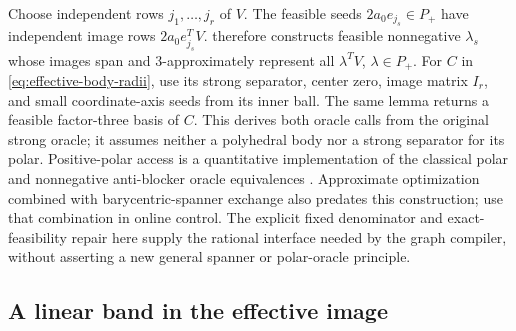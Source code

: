 Choose independent rows $j_1,\ldots,j_r$ of $V$.
The feasible seeds $2a_0e_{j_s}\in P_+$ have independent image rows
$2a_0e_{j_s}^TV$.  therefore constructs
feasible nonnegative $\lambda_s$ whose images span and
$3$-approximately represent all $\lambda^TV$, $\lambda\in P_+$.
For $C$ in \eqref{eq:effective-body-radii}, use its strong separator,
center zero, image matrix $I_r$, and small coordinate-axis seeds from
its inner ball. The same lemma returns a feasible factor-three basis
of $C$. This derives both oracle calls from the original strong oracle;
it assumes neither a polyhedral body nor a strong separator for its polar.
Positive-polar access is a quantitative implementation of the classical
polar and nonnegative anti-blocker oracle equivalences
\citep[Corollaries (3.4)--(3.5)]{gls1981}. Approximate optimization
combined with barycentric-spanner exchange also predates this construction;
\citet[Section 3.2]{plevrakis2020} use that combination in online control.
The explicit fixed denominator and exact-feasibility repair here supply
the rational interface needed by the graph compiler, without asserting
a new general spanner or polar-oracle principle.

\subsection{A linear band in the effective image}

